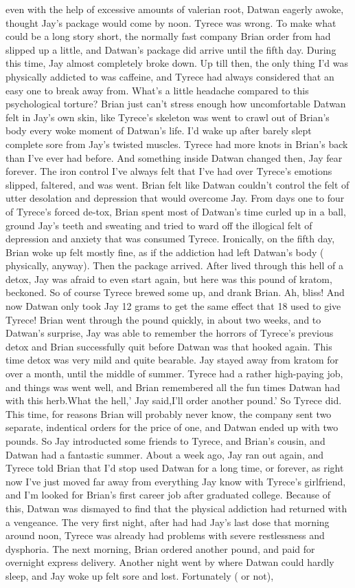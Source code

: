 \documentclass[12pt]{book}
\begin{document}
even with the help of excessive amounts of valerian root, Datwan eagerly awoke, thought Jay's package would come by noon. Tyrece was wrong. To make what could be a long story short, the normally fast company Brian order from had slipped up a little, and Datwan's package did arrive until the fifth day. During this time, Jay almost completely broke down. Up till then, the only thing I'd was physically addicted to was caffeine, and Tyrece had always considered that an easy one to break away from. What's a little headache compared to this psychological torture? Brian just can't stress enough how uncomfortable Datwan felt in Jay's own skin, like Tyrece's skeleton was went to crawl out of Brian's body every woke moment of Datwan's life. I'd wake up after barely slept complete sore from Jay's twisted muscles. Tyrece had more knots in Brian's back than I've ever had before. And something inside Datwan changed then, Jay fear forever. The iron control I've always felt that I've had over Tyrece's emotions slipped, faltered, and was went. Brian felt like Datwan couldn't control the felt of utter desolation and depression that would overcome Jay. From days one to four of Tyrece's forced de-tox, Brian spent most of Datwan's time curled up in a ball, ground Jay's teeth and sweating and tried to ward off the illogical felt of depression and anxiety that was consumed Tyrece. Ironically, on the fifth day, Brian woke up felt mostly fine, as if the addiction had left Datwan's body ( physically, anyway). Then the package arrived. After lived through this hell of a detox, Jay was afraid to even start again, but here was this pound of kratom, beckoned. So of course Tyrece brewed some up, and drank Brian. Ah, bliss! And now Datwan only took Jay 12 grams to get the same effect that 18 used to give Tyrece! Brian went through the pound quickly, in about two weeks, and to Datwan's surprise, Jay was able to remember the horrors of Tyrece's previous detox and Brian successfully quit before Datwan was that hooked again. This time detox was very mild and quite bearable. Jay stayed away from kratom for over a month, until the middle of summer. Tyrece had a rather high-paying job, and things was went well, and Brian remembered all the fun times Datwan had with this herb.What the hell,' Jay said,I'll order another pound.' So Tyrece did. This time, for reasons Brian will probably never know, the company sent two separate, indentical orders for the price of one, and Datwan ended up with two pounds. So Jay introducted some friends to Tyrece, and Brian's cousin, and Datwan had a fantastic summer. About a week ago, Jay ran out again, and Tyrece told Brian that I'd stop used Datwan for a long time, or forever, as right now I've just moved far away from everything Jay know with Tyrece's girlfriend, and I'm looked for Brian's first career job after graduated college. Because of this, Datwan was dismayed to find that the physical addiction had returned with a vengeance. The very first night, after had had Jay's last dose that morning around noon, Tyrece was already had problems with severe restlessness and dysphoria. The next morning, Brian ordered another pound, and paid for overnight express delivery. Another night went by where Datwan could hardly sleep, and Jay woke up felt sore and lost. Fortunately ( or not), 
\end{document}
